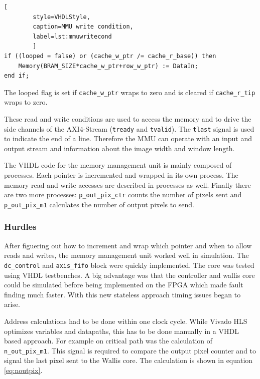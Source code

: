 \begin{minipage}{\linewidth}
    \begin{lstlisting}[
        style=VHDLStyle, 
        caption=MMU write condition, 
        label=lst:mmuwritecond
        ]
if ((looped = false) or (cache_w_ptr /= cache_r_base)) then
    Memory(BRAM_SIZE*cache_w_ptr+row_w_ptr) := DataIn;
end if;\end{lstlisting}
\end{minipage}

The looped flag is set if \texttt{cache\_w\_ptr} wraps to zero and is cleared if
\texttt{cache\_r\_tip} wraps to zero.

These read and write conditions are used to access the memory and to drive the
side channels of the AXI4-Stream (\texttt{tready} and \texttt{tvalid}). The 
\texttt{tlast} signal is used to indicate the end of a line. Therefore the MMU
can operate with an input and output stream and information about the image
width and window length.

The VHDL code for the memory management unit is mainly composed of processes.
Each pointer is incremented and wrapped in its own process. The memory read and
write accesses are described in processes as well. Finally there are two more
processes: \texttt{p\_out\_pix\_ctr} counts the number of pixels sent and
\texttt{p\_out\_pix\_m1} calculates the number of output pixels to send.



\subsubsection*{Hurdles}
After figuering out how to increment and wrap which pointer and when to allow
reads and writes, the memory management unit worked well in simulation. The
\texttt{dc\_control} and \texttt{axis\_fifo} block were quickly implemented. The
core was tested using VHDL testbenches. A big advantage was that the controller
and wallis core could be simulated before being implemented on the FPGA which
made fault finding much faster. With this new stateless approach timing issues
began to arise. 

Address calculations had to be done within one clock cycle. While Vivado HLS
optimizes variables and datapaths, this has to be done manually in a VHDL based
approach. For example on critical path was the calculation of 
\texttt{n\_out\_pix\_m1}. This signal is required to compare the output pixel
counter and to signal the last pixel sent to the Wallis core. The calculation is
shown in equation \ref{eq:noutpix}.

